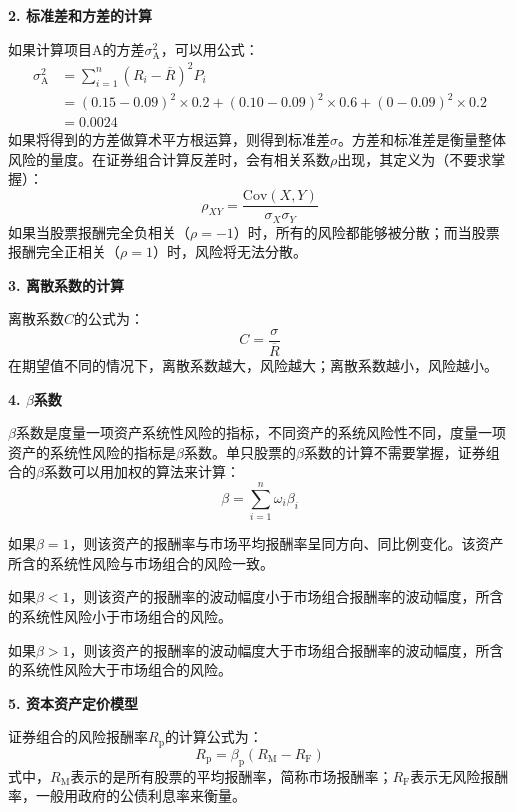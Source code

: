 \documentclass[
  10pt,
  twoside,
  openany,
  b5paper, %
  colorscheme = black, %
  xits = false,
]{qyxf-book}
\begin{document}
\textbf{2. 标准差和方差的计算}

如果计算项目A的方差$\sigma^2_\mathrm{A}$，可以用公式：
\begin{equation*}
	\begin{aligned}
		\sigma^2_\mathrm{A} &= \sum_{i=1}^{n} (R_i-\overline{R})^2 P_i \\
				 &= (0.15-0.09)^2 \times 0.2 + (0.10-0.09)^2 \times 0.6 + (0-0.09)^2 \times 0.2 \\
				 &= 0.0024
	\end{aligned}
\end{equation*}
如果将得到的方差做算术平方根运算，则得到标准差$\sigma$。方差和标准差是衡量整体风险的量度。在证券组合计算反差时，会有相关系数$\rho$出现，其定义为（不要求掌握）：
\begin{equation*}
	\rho_{XY}=\frac{\mathrm{Cov}(X,Y)}{\sigma_X \sigma_Y}	
\end{equation*}
如果当股票报酬完全负相关（$\rho=-1$）时，所有的风险都能够被分散；而当股票报酬完全正相关（$\rho=1$）时，风险将无法分散。

\textbf{3. 离散系数的计算}

离散系数$C$的公式为：
\begin{equation*}
	C = \frac{\sigma}{\overline{R}}
\end{equation*}
在期望值不同的情况下，离散系数越大，风险越大；离散系数越小，风险越小。

\textbf{4. $\beta$系数}

$\beta$系数是度量一项资产系统性风险的指标，不同资产的系统风险性不同，度量一项资产的系统性风险的指标是$\beta$系数。单只股票的$\beta$系数的计算不需要掌握，证券组合的$\beta$系数可以用加权的算法来计算：
\begin{equation*}
	\beta = \sum_{i=1}^{n} \omega_i \beta_i
\end{equation*}

如果$\beta=1$，则该资产的报酬率与市场平均报酬率呈同方向、同比例变化。该资产所含的系统性风险与市场组合的风险一致。

如果$\beta <1$，则该资产的报酬率的波动幅度小于市场组合报酬率的波动幅度，所含的系统性风险小于市场组合的风险。

如果$\beta >1$，则该资产的报酬率的波动幅度大于市场组合报酬率的波动幅度，所含的系统性风险大于市场组合的风险。

\textbf{5. 资本资产定价模型}

证券组合的风险报酬率$R_\mathrm{p}$的计算公式为：
\begin{equation*}
	R_\mathrm{p} = \beta_\mathrm{p} (R_\mathrm{M}-R_\mathrm{F})
\end{equation*}
式中，$R_\mathrm{M}$表示的是所有股票的平均报酬率，简称市场报酬率；$R_\mathrm{F}$表示无风险报酬率，一般用政府的公债利息率来衡量。
\end{document}
